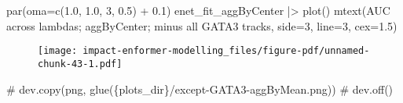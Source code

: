 \documentclass[
  letterpaper,
  DIV=11,
  numbers=noendperiod]{scrartcl}
\newenvironment{Shaded}{\begin{snugshade}}{\end{snugshade}}
\newcommand{\AttributeTok}[1]{\textcolor[rgb]{0.40,0.45,0.13}{#1}}
\newcommand{\CommentTok}[1]{\textcolor[rgb]{0.37,0.37,0.37}{#1}}
\newcommand{\DecValTok}[1]{\textcolor[rgb]{0.68,0.00,0.00}{#1}}
\newcommand{\FloatTok}[1]{\textcolor[rgb]{0.68,0.00,0.00}{#1}}
\newcommand{\FunctionTok}[1]{\textcolor[rgb]{0.28,0.35,0.67}{#1}}
\newcommand{\NormalTok}[1]{\textcolor[rgb]{0.00,0.23,0.31}{#1}}
\newcommand{\OtherTok}[1]{\textcolor[rgb]{0.00,0.23,0.31}{#1}}
\newcommand{\SpecialCharTok}[1]{\textcolor[rgb]{0.37,0.37,0.37}{#1}}
\newcommand{\StringTok}[1]{\textcolor[rgb]{0.13,0.47,0.30}{#1}}
\begin{document}
\begin{Shaded}
\begin{Highlighting}[]
\FunctionTok{par}\NormalTok{(}\AttributeTok{oma=}\FunctionTok{c}\NormalTok{(}\FloatTok{1.0}\NormalTok{, }\FloatTok{1.0}\NormalTok{, }\DecValTok{3}\NormalTok{, }\FloatTok{0.5}\NormalTok{) }\SpecialCharTok{+} \FloatTok{0.1}\NormalTok{)}
\NormalTok{enet\_fit\_aggByCenter }\SpecialCharTok{|\textgreater{}} \FunctionTok{plot}\NormalTok{()}
\FunctionTok{mtext}\NormalTok{(}\StringTok{\textquotesingle{}AUC across lambdas; aggByCenter; minus all GATA3 tracks\textquotesingle{}}\NormalTok{, }\AttributeTok{side=}\DecValTok{3}\NormalTok{, }\AttributeTok{line=}\DecValTok{3}\NormalTok{, }\AttributeTok{cex=}\FloatTok{1.5}\NormalTok{)}
\end{Highlighting}
\end{Shaded}

\begin{figure}[H]

{\centering \texttt{[image: impact-enformer-modelling\_files/figure-pdf/unnamed-chunk-43-1.pdf]}

}

\end{figure}

\begin{Shaded}
\begin{Highlighting}[]
\CommentTok{\# dev.copy(png, glue(\textquotesingle{}\{plots\_dir\}/except{-}GATA3{-}aggByMean.png\textquotesingle{}))}
\CommentTok{\# dev.off()}
\end{Highlighting}
\end{Shaded}

\begin{Shaded}
\end{Shaded}

\begin{Shaded}
\end{Shaded}
\end{document}
